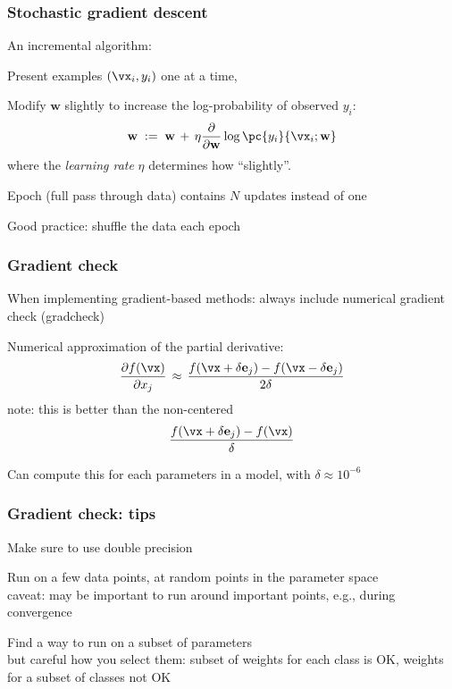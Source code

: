 \documentclass[xcolor=dvipsnames]{beamer}
\begin{document}
\begin{frame}\frametitle{Stochastic gradient descent}
\bi
\item An incremental algorithm: 
  \bi
\item Present examples $(\vx_i,y_i)$ one at a time, 
\item Modify $\mathbf{w}$ slightly to increase the log-probability of
  observed $y_i$:
\[\mathbf{w}\;:=\;\mathbf{w}\,+\,\eta\frac{\partial}{\partial\mathbf{w}}\log\pc{y_i}{\vx_i;\mathbf{w}}\]
where the \emph{learning rate} $\eta$ determines how ``slightly''.
\ei
\item Epoch (full pass through data) contains $N$ updates instead of one
\item Good practice: shuffle the data each epoch
\ei


\end{frame}  


\begin{frame}
  \frametitle{Gradient check}
  \bi
\item When implementing gradient-based methods: always include
  numerical gradient check (gradcheck)
\item Numerical approximation of the partial derivative:
\[\frac{\partial f(\vx)}{\partial x_j}\,\approx\,
\frac{f(\vx+\delta\mathbf{e}_j)-f(\vx-\delta\mathbf{e}_j)}{2\delta}
\]
note: this is better than the non-centered 
\[\frac{f(\vx+\delta\mathbf{e}_j)-f(\vx)}{\delta}
\]
\item Can compute this for each parameters in a model, with
  $\delta\approx 10^{-6}$
\ei
\end{frame}


\begin{frame}
  \frametitle{Gradient check: tips}
  \bi
\item Make sure to use double precision
\item Run on a few data points, at random points in the parameter
  space\\
caveat: may be important to run around important points, e.g., during
convergence
\item Find a way to run on a subset of parameters\\
but careful how you select them: subset of weights for each class is
OK, weights for a subset of classes not OK
\ei
\end{frame}
\end{document}
